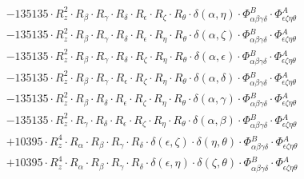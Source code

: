 \documentclass{article}
\begin{document}
\begin{equation}
\begin{array}{c}
 \\[0.2em] 		 - 135135 \cdot R_{z}^{2} \cdot R_{\beta{}} \cdot R_{\gamma{}} \cdot R_{\delta{}} \cdot R_{\epsilon{}} \cdot R_{\zeta{}} \cdot R_{\theta{}} \cdot \delta{}\left(\alpha{}, \eta{}\right) \cdot \Phi{}^{B}_{\alpha{}\beta{}\gamma{}\delta{}} \cdot \Phi{}^{A}_{\epsilon{}\zeta{}\eta{}\theta{}} 
 \\[0.2em] 		 - 135135 \cdot R_{z}^{2} \cdot R_{\beta{}} \cdot R_{\gamma{}} \cdot R_{\delta{}} \cdot R_{\epsilon{}} \cdot R_{\eta{}} \cdot R_{\theta{}} \cdot \delta{}\left(\alpha{}, \zeta{}\right) \cdot \Phi{}^{B}_{\alpha{}\beta{}\gamma{}\delta{}} \cdot \Phi{}^{A}_{\epsilon{}\zeta{}\eta{}\theta{}} 
 \\[0.2em] 		 - 135135 \cdot R_{z}^{2} \cdot R_{\beta{}} \cdot R_{\gamma{}} \cdot R_{\delta{}} \cdot R_{\zeta{}} \cdot R_{\eta{}} \cdot R_{\theta{}} \cdot \delta{}\left(\alpha{}, \epsilon{}\right) \cdot \Phi{}^{B}_{\alpha{}\beta{}\gamma{}\delta{}} \cdot \Phi{}^{A}_{\epsilon{}\zeta{}\eta{}\theta{}} 
 \\[0.2em] 		 - 135135 \cdot R_{z}^{2} \cdot R_{\beta{}} \cdot R_{\gamma{}} \cdot R_{\epsilon{}} \cdot R_{\zeta{}} \cdot R_{\eta{}} \cdot R_{\theta{}} \cdot \delta{}\left(\alpha{}, \delta{}\right) \cdot \Phi{}^{B}_{\alpha{}\beta{}\gamma{}\delta{}} \cdot \Phi{}^{A}_{\epsilon{}\zeta{}\eta{}\theta{}} 
 \\[0.2em] 		 - 135135 \cdot R_{z}^{2} \cdot R_{\beta{}} \cdot R_{\delta{}} \cdot R_{\epsilon{}} \cdot R_{\zeta{}} \cdot R_{\eta{}} \cdot R_{\theta{}} \cdot \delta{}\left(\alpha{}, \gamma{}\right) \cdot \Phi{}^{B}_{\alpha{}\beta{}\gamma{}\delta{}} \cdot \Phi{}^{A}_{\epsilon{}\zeta{}\eta{}\theta{}} 
 \\[0.2em] 		 - 135135 \cdot R_{z}^{2} \cdot R_{\gamma{}} \cdot R_{\delta{}} \cdot R_{\epsilon{}} \cdot R_{\zeta{}} \cdot R_{\eta{}} \cdot R_{\theta{}} \cdot \delta{}\left(\alpha{}, \beta{}\right) \cdot \Phi{}^{B}_{\alpha{}\beta{}\gamma{}\delta{}} \cdot \Phi{}^{A}_{\epsilon{}\zeta{}\eta{}\theta{}} 
 \\[0.2em] 		 + 10395 \cdot R_{z}^{4} \cdot R_{\alpha{}} \cdot R_{\beta{}} \cdot R_{\gamma{}} \cdot R_{\delta{}} \cdot \delta{}\left(\epsilon{}, \zeta{}\right) \cdot \delta{}\left(\eta{}, \theta{}\right) \cdot \Phi{}^{B}_{\alpha{}\beta{}\gamma{}\delta{}} \cdot \Phi{}^{A}_{\epsilon{}\zeta{}\eta{}\theta{}} 
 \\[0.2em] 		 + 10395 \cdot R_{z}^{4} \cdot R_{\alpha{}} \cdot R_{\beta{}} \cdot R_{\gamma{}} \cdot R_{\delta{}} \cdot \delta{}\left(\epsilon{}, \eta{}\right) \cdot \delta{}\left(\zeta{}, \theta{}\right) \cdot \Phi{}^{B}_{\alpha{}\beta{}\gamma{}\delta{}} \cdot \Phi{}^{A}_{\epsilon{}\zeta{}\eta{}\theta{}} 

\end{array}
\end{equation}
\end{document}
